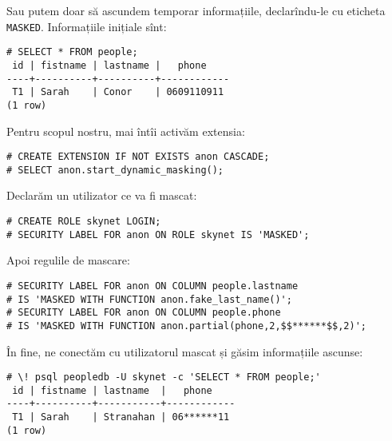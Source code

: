 Sau putem doar să ascundem temporar informațiile, declarîndu-le cu
eticheta \texttt{MASKED}. Informațiile inițiale sînt:
{
  \small
\begin{verbatim}
# SELECT * FROM people;
 id | fistname | lastname |   phone    
----+----------+----------+------------
 T1 | Sarah    | Conor    | 0609110911
(1 row)
\end{verbatim}
}

Pentru scopul nostru, mai întîi activăm extensia:
{
  \small
\begin{verbatim}
# CREATE EXTENSION IF NOT EXISTS anon CASCADE;
# SELECT anon.start_dynamic_masking();
\end{verbatim}
}

Declarăm un utilizator ce va fi mascat:
{
  \small
\begin{verbatim}
# CREATE ROLE skynet LOGIN;
# SECURITY LABEL FOR anon ON ROLE skynet IS 'MASKED';
\end{verbatim}
}

Apoi regulile de mascare:
{
  \small
\begin{verbatim}
# SECURITY LABEL FOR anon ON COLUMN people.lastname 
# IS 'MASKED WITH FUNCTION anon.fake_last_name()';
# SECURITY LABEL FOR anon ON COLUMN people.phone 
# IS 'MASKED WITH FUNCTION anon.partial(phone,2,$$******$$,2)';
\end{verbatim}
}

În fine, ne conectăm cu utilizatorul mascat și găsim informațiile ascunse:
{
  \small
\begin{verbatim}
# \! psql peopledb -U skynet -c 'SELECT * FROM people;'
 id | fistname | lastname  |   phone    
----+----------+-----------+------------
 T1 | Sarah    | Stranahan | 06******11
(1 row)
\end{verbatim}
}


